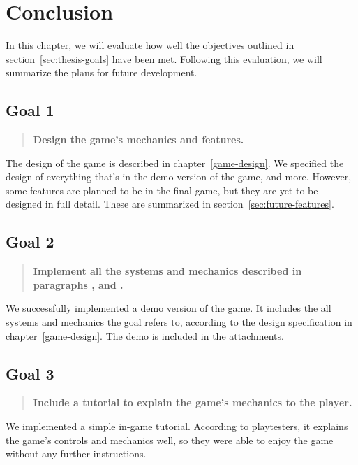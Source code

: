 \chapter{Conclusion}

In this chapter, we will evaluate how well the objectives outlined in section~\ref{sec:thesis-goals} have been met.
Following this evaluation, we will summarize the plans for future development.

\section{Goal 1}

\begin{quotation}
    \textbf{Design the game's mechanics and features.}
\end{quotation}

The design of the game is described in chapter~\ref{game-design}.
We specified the design of everything that's in the demo version of the game, and more.
However, some features are planned to be in the final game, but they are yet to be designed in full detail.
These are summarized in section~\ref{sec:future-features}.

\section{Goal 2}

\begin{quotation}
    \textbf{Implement all the systems and mechanics described in paragraphs ,  and .}
\end{quotation}

We successfully implemented a demo version of the game.
It includes the all systems and mechanics the goal refers to, according to the design specification in chapter~\ref{game-design}.
The demo is included in the attachments.

\section{Goal 3}

\begin{quotation}
    \textbf{Include a tutorial to explain the game's mechanics to the player.}
\end{quotation}

We implemented a simple in-game tutorial.
According to playtesters, it explains the game's controls and mechanics well, so they were able to enjoy the game without any further instructions.


